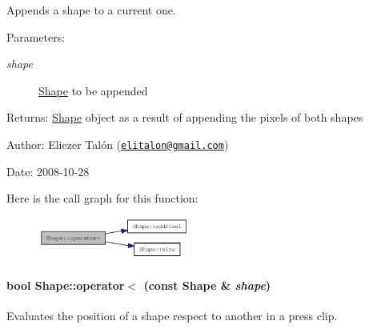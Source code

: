 Appends a shape to a current one. 

\begin{Desc}
\item[Parameters:]
\begin{description}
\item[{\em shape}]\hyperlink{class_shape}{Shape} to be appended\end{description}
\end{Desc}
\begin{Desc}
\item[Returns:]\hyperlink{class_shape}{Shape} object as a result of appending the pixels of both shapes\end{Desc}
\begin{Desc}
\item[Author:]Eliezer Talón (\href{mailto:elitalon@gmail.com}{\tt elitalon@gmail.com}) \end{Desc}
\begin{Desc}
\item[Date:]2008-10-28 \end{Desc}


Here is the call graph for this function:\nopagebreak
\begin{figure}[H]
\begin{center}
\leavevmode
\includegraphics[width=141pt]{class_shape_4e1517d6e14471df4750bc241f517b4e_cgraph}
\end{center}
\end{figure}
\hypertarget{class_shape_183a6bc428172ced8122ffb68d0f04ef}{
\paragraph[{operator$<$}]{\setlength{\rightskip}{0pt plus 5cm}bool Shape::operator$<$ (const {\bf Shape} \& {\em shape})}\hfill}
\label{class_shape_183a6bc428172ced8122ffb68d0f04ef}


Evaluates the position of a shape respect to another in a press clip. 

